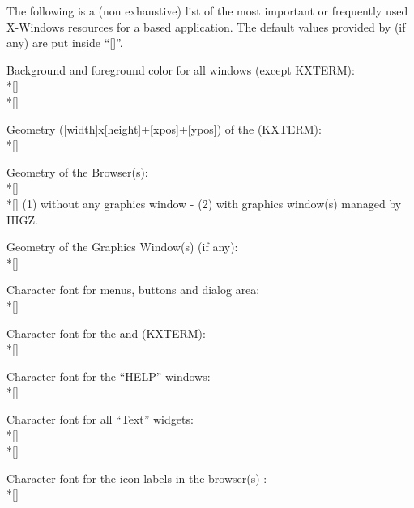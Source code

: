 The following is a (non exhaustive) list of the most important or frequently 
used X-Windows resources for a \KUIPMotif{} based application. The default
values provided by \KUIPMotif{} (if any) are put inside ``[]''.
\begin{UL}
\item
Background and foreground color for all windows (except KXTERM):
\\*[\smallskipamount]\mbox{}
\\*[\smallskipamount]\mbox{}
\item
Geometry ([width]x[height]+[xpos]+[ypos]) of the \EW{} (KXTERM):
\\*[\smallskipamount]\mbox{}
\item
Geometry of the Browser(s):
\\*[\smallskipamount]\mbox{}\\*[\smallskipamount]
(1) without any graphics window - (2) with graphics window(s) managed by HIGZ.
\item
Geometry of the Graphics Window(s) (if any):
\\*[\smallskipamount]\mbox{}
\item
Character font for menus, buttons and dialog area:
\\*[\smallskipamount]\mbox{}
\item
Character font for the \INP{} and \TP{} (KXTERM):
\\*[\smallskipamount]\mbox{}
\item
Character font for the ``HELP'' windows:
\\*[\smallskipamount]\mbox{}
\item
Character font for all ``Text'' widgets:
\\*[\smallskipamount]\mbox{}
\\*[\smallskipamount]\mbox{}
\item
Character font for the icon labels in the browser(s) \OW{}:
\\*[\smallskipamount]\mbox{}
\item

\end{UL}
